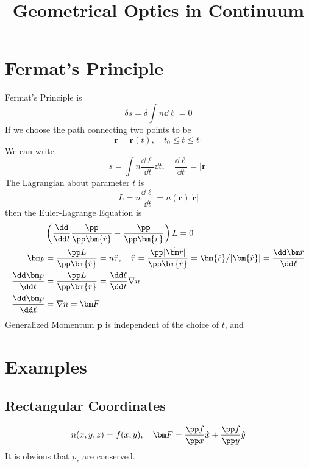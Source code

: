 \documentclass[12pt]{article}
\title{Geometrical Optics in Continuum}
\author{\zpj}
\begin{document}
\maketitle
\section{Fermat's Principle}
Fermat's Principle is
\begin{equation}
\delta s=\delta\int n\dd \ell=0
\end{equation}
If we choose the path connecting two points to be
\begin{equation}\bm r=\bm r(t),\quad t_0\leq t\leq t_1\end{equation}
We can write
\begin{equation}
s=\int n\frac{\dd \ell}{\dd t}\dd t, \quad \frac{\dd \ell}{\dd t}=|\dot{\bm r}|
\end{equation}
The Lagrangian about parameter $t$ is
\begin{equation}
L=n\frac{\dd \ell}{\dd t}=n(\bm r)|\bm{\dot r}|
\end{equation}
then the Euler-Lagrange Equation is
\begin{align}
&\left(\frac{\dd}{\dd t}\frac{\pp}{\pp\bm{\dot r}}-\frac{\pp}{\pp\bm{r}}\right)L=0\\
\bm p&=\frac{\pp L}{\pp \bm{\dot r}}=n \hat\tau,\quad\hat{\tau}=\frac{\pp |\dot{\bm r}|}{\pp \bm{\dot r}}=\bm{\dot r}/|\bm{\dot r}|=\frac{\dd\bm r}{\dd\ell}\\
\frac{\dd \bm p}{\dd t}&=\frac{\pp L}{\pp \bm{r}}=\frac{\dd\ell}{\dd t}\nabla n\\
\frac{\dd \bm p}{\dd \ell}&=\nabla n=\bm F
\end{align}
Generalized Momentum $\bm p$ is independent of the choice of $t$, and 
\section{Examples}
\subsection{Rectangular Coordinates}
\begin{equation}
	n(x,y,z)=f(x,y),\quad\bm F=\frac{\pp f}{\pp x}\hat x+\frac{\pp f}{\pp y}\hat y
\end{equation}
It is obvious that $p_z$ are conserved.
\end{document}
